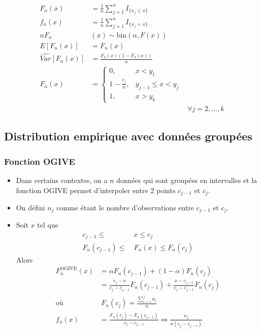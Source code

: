 \documentclass[10pt, french]{article}
\begin{document}
\begin{multicols*}{3}
\begin{align*}
F_n(x) &= \frac{1}{n} \sum\limits_{j=1}^n I_{\{ x_j \leq x\}} \\
f_n(x) &= \frac{1}{n} \sum\limits_{j=1}^n I_{\{ x_j = x\}}  \\
 n F_n&(x)  \sim \text{bin}(n, F(x))\\
E[F_n(x)] &
		= F_n(x)\\
\widehat{Var}[F_n(x)] &
= \frac{F_n(x)(1 - F_n(x))}{n}  \\
F_n(x) &= 
\left\{
	\begin{array}{ll}
		0,  &  x < y_1 \\
        1 - \frac{r_j}{n}, &  y_{j-1} \leq x < y_j \\
        1, & x > y_k 
	\end{array}
\right. \\
&&\forall j=2,...,k
\end{align*}

\subsection*{Distribution empirique avec données groupées}
\subsubsection*{Fonction OGIVE}
\begin{itemize}
    \item Dans certains contextes, on a $n$ données qui sont groupées en intervalles et la fonction OGIVE permet d'interpoler entre 2 points $c_{j - 1}$ et $c_j$.
    \item On défini $n_j$ comme étant le nombre d'observations entre $c_{j - 1}$ et $c_{j}$.
    \item Soit $x$ tel que
    \begin{align*}
    		c_{j - 1} \le &\ x \le c_j \\
    		F_{n	}(c_{j - 1}) \le &\ F_{n}(x) \le F_{n}(c_{j}) 
    \end{align*}
    Alors 
    \begin{align*}
		F_{n}^{\text{OGIVE}}(x) &= \alpha F_{n}(c_{j - 1}) + (1 - \alpha) F_{n}(c_{j}) \\
		&= \frac{c_{j} - x}{c_{j} - c_{j - 1}} F_{n}(c_{j - 1}) + \frac{x - c_{j - 1}}{c_{j} - c_{j - 1}} F_{n}(c_{j}) \\
       	\text{où } &\ F_{n}(c_j) = \frac{\sum_{i = 1}^{j} n_{i}}{n} \\
       	f_n(x) &= \frac{F_{n}(c_{j}) - F_{n}(c_{j - 1})}{c_{j} - c_{j - 1}} \Leftrightarrow \frac{n_j}{n(c_{j} - c_{j - 1})} \\
    \end{align*}
\end{itemize}


\end{multicols*}
\end{document}

